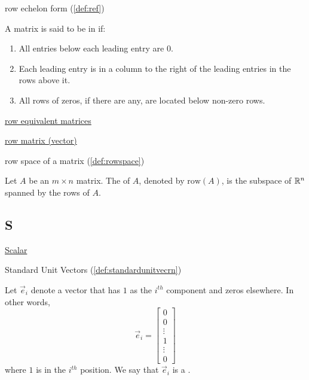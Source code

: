 \documentclass{ximera}
\begin{document}

row echelon form (\ref{def:ref})
\begin{expandable}
    A matrix is said to be in  if:
\begin{enumerate}
\item All entries below each leading entry are 0.
\item Each leading entry is in a column to the right of the leading entries in the rows above it.
\item All rows of zeros, if there are any, are located below non-zero rows.
\end{enumerate}
\end{expandable}

\href{https://ximera.osu.edu/oerlinalg/LinearAlgebra/SYS-0020/main}{row equivalent matrices}

\href{https://ximera.osu.edu/oerlinalg/LinearAlgebra/MAT-0010/main}{row matrix (vector)}

row space of a matrix (\ref{def:rowspace})
\begin{expandable}
    Let $A$ be an $m\times n$ matrix.  The  of $A$, denoted by $\mbox{row}(A)$, is the subspace of $\mathbb{R}^n$ spanned by the rows of $A$.
\end{expandable}


\subsection{S}
\href{https://ximera.osu.edu/oerlinalg/LinearAlgebra/VEC-0010/main}{Scalar} 

Standard Unit Vectors (\ref{def:standardunitvecrn})
\begin{expandable}
  Let $\vec{e}_i$ denote a vector that has $1$ as the $i^{th}$ component and zeros elsewhere.  In other words, $$\vec{e}_i=\begin{bmatrix}
0\\
0\\
\vdots\\
1\\
\vdots\\
0
\end{bmatrix}$$ 
  where $1$ is in the $i^{th}$ position.  We say that  $\vec{e}_i$ is a .
\end{expandable}

\end{document}
